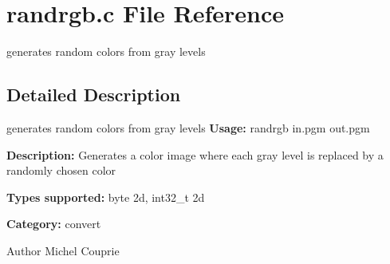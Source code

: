 \section{randrgb.c File Reference}
\label{randrgb_8c}


generates random colors from gray levels  




\subsection{Detailed Description}
generates random colors from gray levels {\bfseries Usage:} randrgb in.pgm out.pgm

{\bfseries Description:} Generates a color image where each gray level is replaced by a randomly chosen color

{\bfseries Types supported:} byte 2d, int32\_\-t 2d

{\bfseries Category:} convert

\begin{DoxyAuthor}{Author}
Michel Couprie 
\end{DoxyAuthor}

